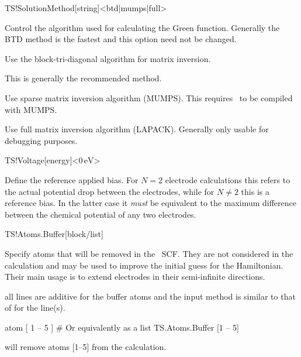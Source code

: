 \begin{fdfentry}{TS!SolutionMethod}[string]<btd|mumps|full>

  Control the algorithm used for calculating the Green
  function. Generally the BTD method is the fastest and this option
  need not be changed.

  \begin{fdfoptions}
    \option[BTD]%
    Use the block-tri-diagonal algorithm for matrix inversion.

    This is generally the recommended method.

    \option[MUMPS]%
    Use sparse matrix inversion algorithm (MUMPS). This requires
    \tsiesta\ to be compiled with MUMPS.

    \option[full]%
    Use full matrix inversion algorithm (LAPACK). Generally only
    usable for debugging purposes.
    
  \end{fdfoptions}
  
\end{fdfentry}

\begin{fdfentry}{TS!Voltage}[energy]<$0\,\mathrm{eV}$>

  Define the reference applied bias. For $N=2$ electrode calculations
  this refers to the actual potential drop between the electrodes,
  while for $N\neq2$ this is a reference bias. In the latter case it
  \emph{must} be equivalent to the maximum difference between the
  chemical potential of any two electrodes.
  
\end{fdfentry}

\begin{fdfentry}{TS!Atoms.Buffer}[block/list]

  Specify atoms that will be removed in the \tsiesta\ SCF. They are
  not considered in the calculation and may be used to improve the
  initial guess for the Hamiltonian. Their main usage is to extend
  electrodes in their semi-infinite directions.

  \note all lines are additive for the buffer atoms and the input
  method is similar to that of  for the
   line(s).

  \begin{fdfexample}
       atom [ 1 -- 5 ]
    # Or equivalently as a list   
    TS.Atoms.Buffer [1 -- 5]
  \end{fdfexample}
  will remove atoms [1--5] from the calculation.

\end{fdfentry}

